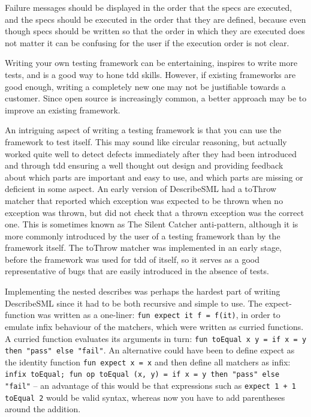 \documentclass[11pt]{article}
\begin{document}
Failure messages should be displayed in the order that the \glspl{spec} are executed, and the \glspl{spec} should be executed in the order that they are defined, because even though \glspl{spec} should be written so that the order in which they are executed does not matter it can be confusing for the user if the execution order is not clear.

Writing your own testing framework can be entertaining, inspires to write more tests, and is a good way to hone \gls{tdd} skills. However, if existing frameworks are good enough, writing a completely new one may not be justifiable towards a customer. Since open source is increasingly common, a better approach may be to improve an existing framework.

An intriguing aspect of writing a testing framework is that you can use the framework to test itself. This may sound like circular reasoning, but actually worked quite well to detect defects immediately after they had been introduced and through \gls{tdd} ensuring a well thought out design and providing feedback about which parts are important and easy to use, and which parts are missing or deficient in some aspect. An early version of DescribeSML had a toThrow matcher that reported which exception was expected to be thrown when no exception was thrown, but did not check that a thrown exception was the correct one. This is sometimes known as The Silent Catcher anti-pattern, although it is more commonly introduced by the user of a testing framework than by the framework itself. The toThrow matcher was implemented in an early stage, before the framework was used for \gls{tdd} of itself, so it serves as a good representative of bugs that are easily introduced in the absence of tests.

Implementing the nested describes was perhaps the hardest part of writing DescribeSML since it had to be both recursive and simple to use. The expect-function was written as a one-liner: \texttt{fun expect it f = f(it)}, in order to emulate infix behaviour of the matchers, which were written as curried functions. A curried function evaluates its arguments in turn: \texttt{fun toEqual x y = if x = y then "pass" else "fail"}. An alternative could have been to define expect as the identity function \texttt{fun expect x = x} and then define all matchers as infix: \texttt{infix toEqual; fun op toEqual (x, y) = if x = y then "pass" else "fail"} -- an advantage of this would be that expressions such as \texttt{expect 1 + 1 toEqual 2} would be valid syntax, whereas now you have to add parentheses around the addition.
\end{document}

